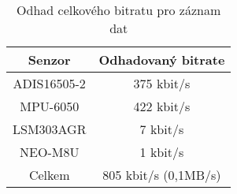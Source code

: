 \begin{table}[h!]
\centering
\begin{tabular}{c|c}

Senzor & Odhadovaný bitrate \\ 
\hline 
\hline 
ADIS16505-2 & 375 kbit/s \\ 

MPU-6050 & 422 kbit/s \\ 

LSM303AGR & 7 kbit/s \\ 

NEO-M8U & 1 kbit/s \\ 
\hline

Celkem & 805 kbit/s (0,1MB/s) \\ 

\end{tabular} 
\caption{Odhad celkového bitratu pro záznam dat} 
\label{table:memoryBW}
\end{table} 